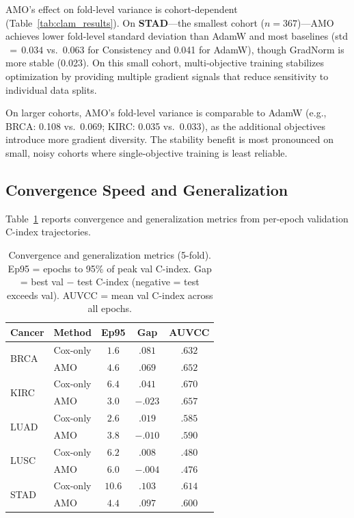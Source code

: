 \documentclass[10pt,twocolumn,letterpaper]{article}
\begin{document}
AMO's effect on fold-level variance is cohort-dependent
(Table~\ref{tab:clam_results}). On \textbf{STAD}---the smallest
cohort ($n\!=\!367$)---AMO achieves lower fold-level standard
deviation than AdamW and most baselines (std$\,=\,0.034$ vs.\
0.063 for Consistency and 0.041 for AdamW), though GradNorm is
more stable (0.023). On this small cohort, multi-objective
training stabilizes optimization by providing multiple gradient
signals that reduce sensitivity to individual data splits.

On larger cohorts, AMO's fold-level variance is comparable to
AdamW (e.g., BRCA: 0.108 vs.\ 0.069; KIRC: 0.035 vs.\ 0.033),
as the additional objectives introduce more gradient diversity.
The stability benefit is most pronounced on small, noisy cohorts
where single-objective training is least reliable.

\subsection{Convergence Speed and Generalization}
\label{sec:convergence}

Table~\ref{tab:convergence} reports convergence and generalization
metrics from per-epoch validation C-index trajectories.

\begin{table}[t]
\centering
\caption{Convergence and generalization metrics (5-fold).
Ep95 = epochs to 95\% of peak val C-index.
Gap = best val $-$ test C-index (negative = test exceeds val).
AUVCC = mean val C-index across all epochs.}
\label{tab:convergence}
\begin{tabular}{llccc}
\toprule
Cancer & Method & Ep95 & Gap & AUVCC \\
\midrule
\multirow{2}{*}{BRCA}
 & Cox-only & $1.6$  & $.081$ & $.632$ \\
 & AMO      & $4.6$  & $\mathbf{.069}$ &
   $\mathbf{.652}$ \\
\midrule
\multirow{2}{*}{KIRC}
 & Cox-only & $6.4$  & $.041$ & $\mathbf{.670}$ \\
 & AMO      & $\mathbf{3.0}$  & $\mathbf{-.023}$ &
   $.657$ \\
\midrule
\multirow{2}{*}{LUAD}
 & Cox-only & $2.6$  & $.019$ & $.585$ \\
 & AMO      & $3.8$  & $\mathbf{-.010}$ &
   $\mathbf{.590}$ \\
\midrule
\multirow{2}{*}{LUSC}
 & Cox-only & $6.2$  & $.008$ & $.480$ \\
 & AMO      & $6.0$  & $\mathbf{-.004}$ &
   $.476$ \\
\midrule
\multirow{2}{*}{STAD}
 & Cox-only & $10.6$ & $.103$ & $\mathbf{.614}$ \\
 & AMO      & $\mathbf{4.4}$  & $\mathbf{.097}$ &
   $.600$ \\
\bottomrule
\end{tabular}
\end{table}
\end{document}
